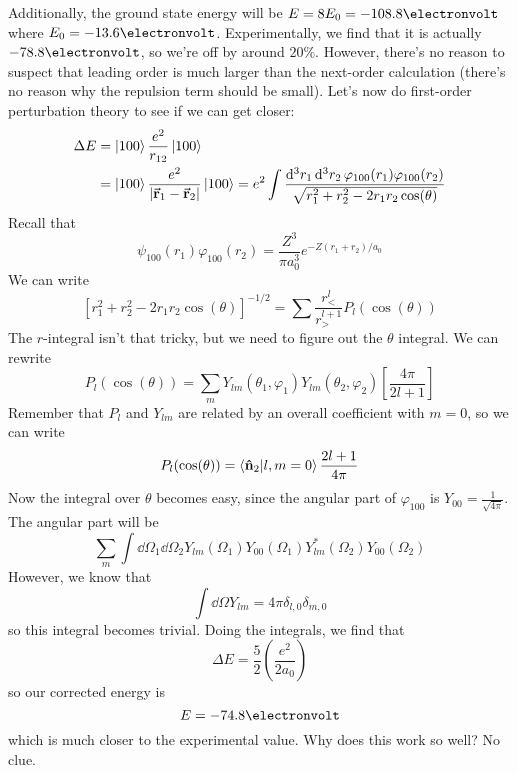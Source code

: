 \documentclass[a4paper,twoside,master.tex]{subfiles}
\begin{document}
Additionally, the ground state energy will be $ E = 8 E_0 = -108.8\electronvolt$ where $ E_0 = -13.6\electronvolt $. Experimentally, we find that it is actually $ -78.8\electronvolt $, so we're off by around $ 20\% $. However, there's no reason to suspect that leading order is much larger than the next-order calculation (there's no reason why the repulsion term should be small). Let's now do first-order perturbation theory to see if we can get closer:
\begin{align}
    \Delta E &= \ket{100} \frac{e^2}{r_{12}}\ket{100} \\
    &=\ket{100} \frac{e^2}{\abs{\va{r}_1 - \va{r}_2}}\ket{100} = e^2 \int \frac{\dd[3]{r_1} \dd[3]{r_2} \varphi_{100}(r_1) \varphi_{100}(r_2)}{\sqrt{r_1^2 + r_2^2 - 2r_1 r_2 \cos(\theta)}}
\end{align}
Recall that
\begin{equation}
    \psi_{100}(r_1) \varphi_{100}(r_2)  = \frac{Z^3}{\pi a_0^3} e^{- Z (r_1 + r_2) / a_0}
\end{equation}
We can write
\begin{equation}
    \left[ r_1^2 + r_2^2 - 2 r_1 r_2 \cos(\theta) \right]^{-1/2} = \sum \frac{r_<^l}{r_>^{l+1}} P_l(\cos(\theta))
\end{equation}
The $ r $-integral isn't that tricky, but we need to figure out the $ \theta $ integral. We can rewrite
\begin{equation}
    P_l(\cos(\theta)) = \sum_m Y_{lm}(\theta_1, \varphi_1) Y_{lm}(\theta_2, \varphi_2) \left[ \frac{4 \pi}{2l+1} \right]
\end{equation}
Remember that $ P_l $ and $ Y_{lm} $ are related by an overall coefficient with $ m=0 $, so we can write
\begin{equation}
    P_l(\cos(\theta)) = \bra{\vu{n}_2}\ket{l,m=0} \frac{2l+1}{4 \pi}
\end{equation}
Now the integral over $ \theta $ becomes easy, since the angular part of $ \varphi_{100} $ is $ Y_{00} = \frac{1}{\sqrt{4 \pi}} $. The angular part will be
\begin{equation}
    \sum_m \int \dd{\Omega_1} \dd{\Omega_2} Y_{lm}(\Omega_1) Y_{00}(\Omega_1) Y^*_{lm}(\Omega_2) Y_{00}(\Omega_2)
\end{equation}
However, we know that
\begin{equation}
    \int \dd{\Omega} Y_{lm} = 4 \pi \delta_{l,0} \delta_{m,0}
\end{equation}
so this integral becomes trivial. Doing the integrals, we find that
\begin{equation}
    \Delta E = \frac{5}{2} \left( \frac{e^2}{2 a_0} \right)
\end{equation}
so our corrected energy is 
\begin{equation}
    E = - 74.8\electronvolt
\end{equation}
which is much closer to the experimental value. Why does this work so well? No clue.
\end{document}
